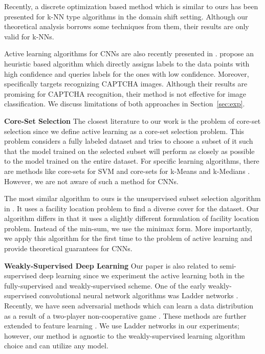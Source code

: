\documentclass{article} %
\begin{document}
Recently, a discrete optimization based method \citep{BerlindU15} which is
similar to ours has been presented for k-NN type algorithms in the domain shift
setting. Although our theoretical analysis borrows some techniques from them, their results are only valid for k-NNs.

Active learning algorithms for CNNs are also recently presented in
\citep{wang2016cost, captcha}. \citet{wang2016cost} propose an heuristic based algorithm which directly assigns
labels to the data points with high confidence and queries labels for the ones
with low confidence. Moreover, \citet{captcha} specifically targets recognizing CAPTCHA images. Although their results are promising for CAPTCHA recognition, their method is not effective for image classification. We discuss limitations of both approaches in Section~\ref{sec:exp}.

\noindent\textbf{Core-Set Selection} The closest literature to our
work is the problem of core-set selection since we define active learning as a
core-set selection problem. This problem considers a
fully labeled dataset and tries to choose a subset of it such that the model
trained on the selected subset will perform as closely as possible to the model
trained on the entire dataset. For specific learning algorithms, there are
methods like core-sets for SVM \citep{tsang2005core} and core-sets for k-Means
and k-Medians \citep{har2005smaller}. However, we are not aware of such a method for CNNs.

The most similar algorithm to ours is the unsupervised subset selection
algorithm in \citep{wei2013using}. It uses a facility location problem
to find a diverse cover for the dataset. Our algorithm differs in that it uses a
slightly different formulation of facility location problem. Instead of the
min-sum, we use the minimax \citep{facility} form. More
importantly, we apply this algorithm for the first time to the problem of active
learning and provide theoretical guarantees for CNNs.
 
\noindent\textbf{Weakly-Supervised Deep Learning} Our paper is also related to
semi-supervised deep learning since we experiment the active learning both in
the fully-supervised and weakly-supervised scheme. One of the early
weakly-supervised convolutional neural network algorithms was Ladder networks
\citep{ladder}. Recently, we have seen adversarial methods which can learn a data
distribution as a result of a two-player non-cooperative game
\citep{salimans2016improved, gan_original, dcgan}. These methods are further
extended to feature learning \citep{ali, bigan}. We use Ladder networks in our
experiments; however, our method is agnostic to the weakly-supervised learning algorithm choice and can
utilize any model.
\end{document}
